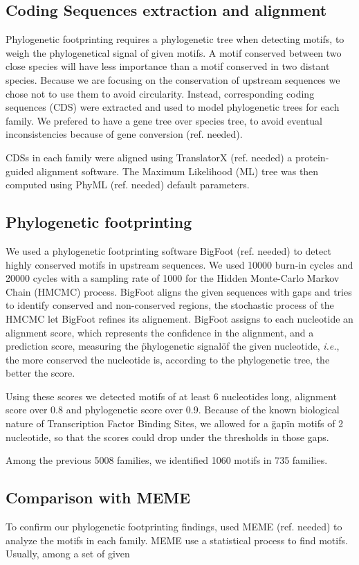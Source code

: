 \subsection{Coding Sequences extraction and alignment}

Phylogenetic footprinting requires a phylogenetic tree when detecting motifs, to weigh the phylogenetical signal of given motifs. A motif conserved between two close species will have less importance than a motif conserved in two distant species. Because we are focusing on the conservation of upstream sequences we chose not to use them to avoid circularity. Instead, corresponding coding sequences (CDS) were extracted and used to model phylogenetic trees for each family. We prefered to have a gene tree over species tree, to avoid eventual inconsistencies because of gene conversion (ref. needed).

CDSs in each family were aligned using TranslatorX (ref. needed) a protein-guided alignment software. The Maximum Likelihood (ML) tree was then computed using PhyML (ref. needed) default parameters.

\subsection{Phylogenetic footprinting}

We used a phylogenetic footprinting software BigFoot (ref. needed) to detect highly conserved motifs in upstream sequences. We used 10000 burn-in cycles and 20000 cycles with a sampling rate of 1000 for the Hidden Monte-Carlo Markov Chain (HMCMC) process. BigFoot aligns the given sequences with gaps and tries to identify conserved and non-conserved regions, the stochastic process of the HMCMC let BigFoot refines its alignement. BigFoot assigns to each nucleotide an alignment score, which represents the confidence in the alignment, and a prediction score, measuring the \"phylogenetic signal\" of the given nucleotide, \textit{i.e.}, the more conserved the nucleotide is, according to the phylogenetic tree, the better the score.

Using these scores we detected motifs of at least 6 nucleotides long, alignment score over 0.8 and phylogenetic score over 0.9. Because of the known biological nature of Transcription Factor Binding Sites, we allowed for a \"gap\" in motifs of 2 nucleotide, so that the scores could drop under the thresholds in those gaps.

Among the previous 5008 families, we identified 1060 motifs in 735 families.

\subsection{Comparison with MEME}

To confirm our phylogenetic footprinting findings, used MEME (ref. needed) to analyze the motifs in each family. MEME use a statistical process to find motifs. Usually, among a set of given


